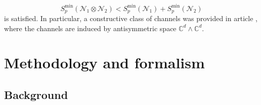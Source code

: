 \documentclass[reqno]{amsart}
\theoremstyle{plain}
\theoremstyle{note}
\newcommand{\complexes}{\mathbb{C}}
\begin{document}
\begin{equation}
    S_{p}^{\mathrm{min}}(\mathcal{N}_1 \otimes \mathcal{N}_2) < S_{p}^{\mathrm{min}}(\mathcal{N}_1) + S_{p}^{\mathrm{min}}(\mathcal{N}_2)
\end{equation}
is satisfied. In particular, a constructive class of channels was provided in article \cite{Grudka_2010}, where the channels are induced by antisymmetric space $\complexes^d \wedge \complexes^d$.

\section{Methodology and formalism}
\label{sec:Methodology}

\subsection{Background}
 
\end{document}
